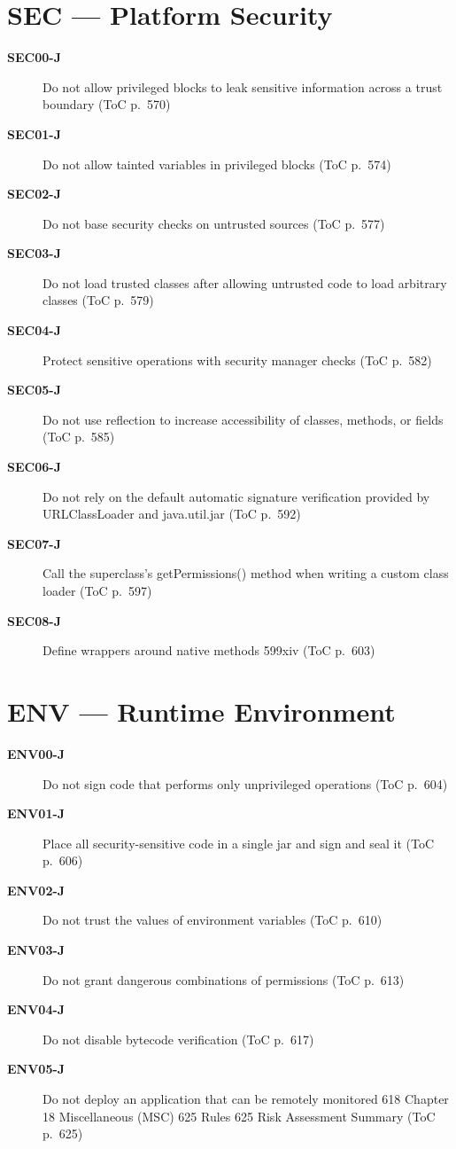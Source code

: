 \documentclass[11pt]{report}
\begin{document}
\chapter{SEC — Platform Security}
\begin{description}
\item[\textbf{SEC00-J}] Do not allow privileged blocks to leak sensitive information across a trust boundary (ToC p.~570)
\item[\textbf{SEC01-J}] Do not allow tainted variables in privileged blocks (ToC p.~574)
\item[\textbf{SEC02-J}] Do not base security checks on untrusted sources (ToC p.~577)
\item[\textbf{SEC03-J}] Do not load trusted classes after allowing untrusted code to load arbitrary classes (ToC p.~579)
\item[\textbf{SEC04-J}] Protect sensitive operations with security manager checks (ToC p.~582)
\item[\textbf{SEC05-J}] Do not use reflection to increase accessibility of classes, methods, or fields (ToC p.~585)
\item[\textbf{SEC06-J}] Do not rely on the default automatic signature verification provided by URLClassLoader and java.util.jar (ToC p.~592)
\item[\textbf{SEC07-J}] Call the superclass’s getPermissions() method when writing a custom class loader (ToC p.~597)
\item[\textbf{SEC08-J}] Define wrappers around native methods 599xiv (ToC p.~603)
\end{description}
\clearpage
\chapter{ENV — Runtime Environment}
\begin{description}
\item[\textbf{ENV00-J}] Do not sign code that performs only unprivileged operations (ToC p.~604)
\item[\textbf{ENV01-J}] Place all security-sensitive code in a single jar and sign and seal it (ToC p.~606)
\item[\textbf{ENV02-J}] Do not trust the values of environment variables (ToC p.~610)
\item[\textbf{ENV03-J}] Do not grant dangerous combinations of permissions (ToC p.~613)
\item[\textbf{ENV04-J}] Do not disable bytecode verification (ToC p.~617)
\item[\textbf{ENV05-J}] Do not deploy an application that can be remotely monitored 618 Chapter 18 Miscellaneous (MSC) 625 Rules 625 Risk Assessment Summary (ToC p.~625)
\end{description}
\clearpage
\end{document}
